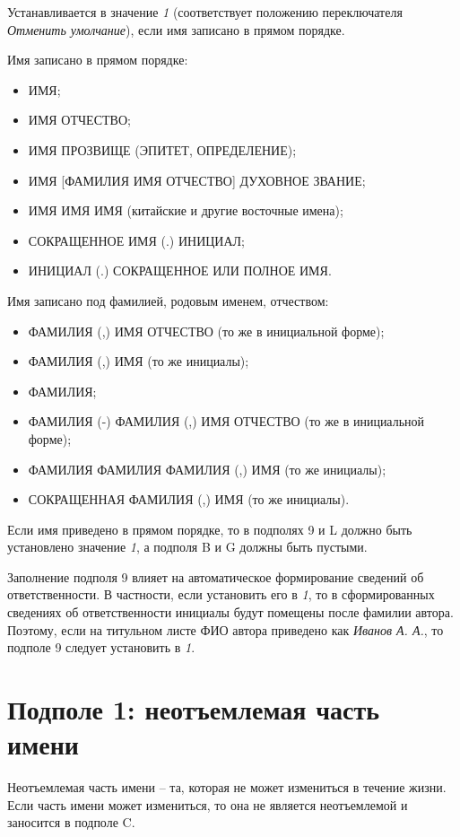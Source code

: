 Устанавливается в значение \emph{1} (соответствует положению переключателя \emph{Отменить умолчание}), если имя записано в прямом порядке.

Имя записано в прямом порядке:

\begin{itemize}
    \item ИМЯ;
    \item ИМЯ ОТЧЕСТВО;
    \item ИМЯ ПРОЗВИЩЕ (ЭПИТЕТ, ОПРЕДЕЛЕНИЕ);
    \item ИМЯ [ФАМИЛИЯ ИМЯ ОТЧЕСТВО] ДУХОВНОЕ ЗВАНИЕ;
    \item ИМЯ ИМЯ ИМЯ (китайские и другие восточные имена);
    \item СОКРАЩЕННОЕ ИМЯ (.) ИНИЦИАЛ;
    \item ИНИЦИАЛ (.) СОКРАЩЕННОЕ ИЛИ ПОЛНОЕ ИМЯ.
\end{itemize}

Имя записано под фамилией, родовым именем, отчеством:

\begin{itemize}
    \item ФАМИЛИЯ (,) ИМЯ ОТЧЕСТВО (то же в инициальной форме);
    \item ФАМИЛИЯ (,) ИМЯ (то же инициалы);
    \item ФАМИЛИЯ;
    \item ФАМИЛИЯ (-) ФАМИЛИЯ (,) ИМЯ ОТЧЕСТВО (то же в инициальной форме);
    \item ФАМИЛИЯ ФАМИЛИЯ ФАМИЛИЯ (,) ИМЯ (то же инициалы);
    \item СОКРАЩЕННАЯ ФАМИЛИЯ (,) ИМЯ (то же инициалы).
\end{itemize}

Если имя приведено в прямом порядке, то в подполях 9 и L должно быть установлено значение \emph{1}, а подполя B и G должны быть пустыми.

Заполнение подполя 9 влияет на автоматическое формирование сведений об ответственности. В частности, если установить его в \emph{1}, то в сформированных сведениях об ответственности инициалы будут помещены после фамилии автора. Поэтому, если на титульном листе ФИО автора приведено как \emph{Иванов А. А.}, то подполе 9 следует установить в \emph{1}.

\section{Подполе 1: неотъемлемая часть имени}

Неотъемлемая часть имени -- та, которая не может измениться в течение жизни. Если часть имени может измениться, то она не является неотъемлемой и заносится в подполе C.

